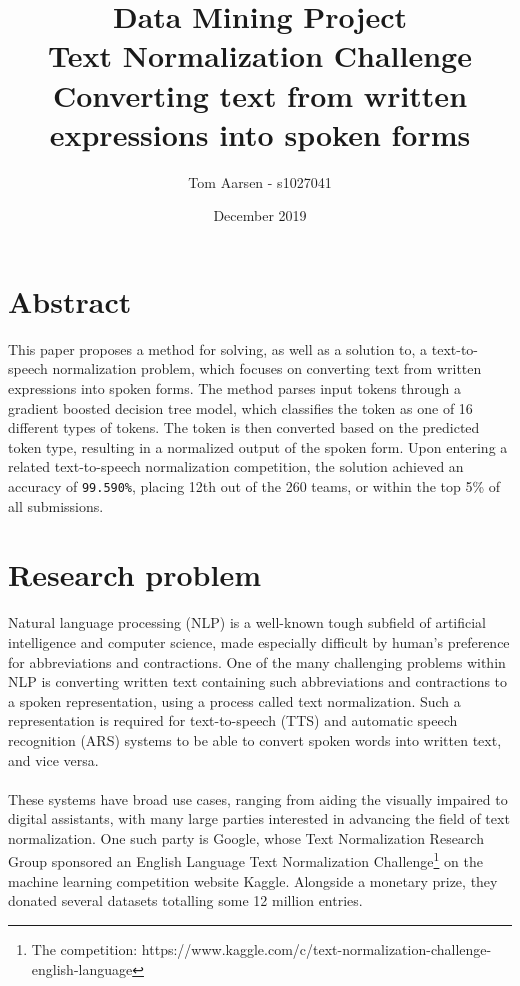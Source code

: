 \documentclass[a4paper, 9pt]{extarticle}
\title{
Data Mining Project\\
Text Normalization Challenge\\
\large Converting text from written expressions into spoken forms}
\author{Tom Aarsen - s1027041}
\date{December 2019}
\newcommand{\code}{\texttt}
\begin{document}
\maketitle
\section{Abstract}\vspace{-1mm}
This paper proposes a method for solving, as well as a solution to, a text-to-speech normalization problem, which focuses on converting text from written expressions into spoken forms. The method parses input tokens through a gradient boosted decision tree model, which classifies the token as one of 16 different types of tokens. The token is then converted based on the predicted token type, resulting in a normalized output of the spoken form. Upon entering a related text-to-speech normalization competition, the solution achieved an accuracy of \code{99.590\%}, placing 12th out of the 260 teams, or within the top 5\% of all submissions.

\section{Research problem}\vspace{-1mm}
Natural language processing (NLP) is a well-known tough subfield of artificial intelligence and computer science, made especially difficult by human's preference for abbreviations and contractions. One of the many challenging problems within NLP is converting written text containing such abbreviations and contractions to a spoken representation, using a process called text normalization. Such a representation is required for text-to-speech (TTS) and automatic speech recognition (ARS) systems to be able to convert spoken words into written text, and vice versa.\\
\\
These systems have broad use cases, ranging from aiding the visually impaired to digital assistants, with many large parties interested in advancing the field of text normalization. One such party is Google, whose Text Normalization Research Group sponsored an English Language Text Normalization Challenge\footnote{The competition: https://www.kaggle.com/c/text-normalization-challenge-english-language} on the machine learning competition website Kaggle. Alongside a monetary prize, they donated several datasets totalling some 12 million entries.
\end{document}

